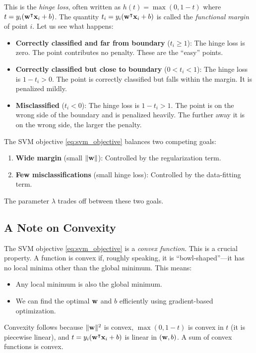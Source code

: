 \documentclass[11pt, letterpaper]{article}
\begin{document}
This is the \emph{hinge loss}, often written as $h(t) = \max(0, 1 - t)$ where $t = y_i(\vb{w}^{\intercal} \vb{x}_i + b)$. The quantity $t_i = y_i(\vb{w}^{\intercal} \vb{x}_i + b)$ is called the \emph{functional margin} of point $i$. Let us see what happens:
\begin{itemize}[leftmargin=2em]
    \item \textbf{Correctly classified and far from boundary} ($t_i \geq 1$): The hinge loss is zero. The point contributes no penalty. These are the ``easy'' points.
    \item \textbf{Correctly classified but close to boundary} ($0 < t_i < 1$): The hinge loss is $1 - t_i > 0$. The point is correctly classified but falls within the margin. It is penalized mildly.
    \item \textbf{Misclassified} ($t_i < 0$): The hinge loss is $1 - t_i > 1$. The point is on the wrong side of the boundary and is penalized heavily. The further away it is on the wrong side, the larger the penalty.
\end{itemize}
The SVM objective \cref{eq:svm_objective} balances two competing goals:
\begin{enumerate}[leftmargin=2em]
    \item \textbf{Wide margin} (small $\|\vb{w}\|$): Controlled by the regularization term.
    \item \textbf{Few misclassifications} (small hinge loss): Controlled by the data-fitting term.
\end{enumerate}
The parameter $\lambda$ trades off between these two goals.

\subsection{A Note on Convexity}

The SVM objective \cref{eq:svm_objective} is a \emph{convex function}. This is a crucial property. A function is convex if, roughly speaking, it is ``bowl-shaped''---it has no local minima other than the global minimum. This means:
\begin{itemize}[leftmargin=2em]
    \item Any local minimum is also the global minimum.
    \item We can find the optimal $\vb{w}$ and $b$ efficiently using gradient-based optimization.
\end{itemize}
Convexity follows because $\|\vb{w}\|^2$ is convex, $\max(0, 1-t)$ is convex in $t$ (it is piecewise linear), and $t = y_i(\vb{w}^{\intercal} \vb{x}_i + b)$ is linear in $(\vb{w}, b)$. A sum of convex functions is convex.
\end{document}

